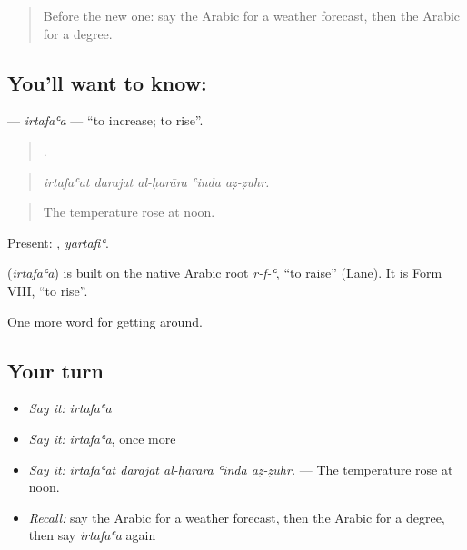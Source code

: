\label{lesson:AR-C480-irtafaa}



\begin{quote}
Before the new one: say the Arabic for a weather forecast, then the Arabic for a degree.
\end{quote}

\subsection*{You'll want to know: }
\textbf{} — \emph{irtafaʿa} — \textquotedblleft{}to increase; to rise\textquotedblright{}.

\begin{quote}
    .
\end{quote}

\begin{quote}
\emph{irtafaʿat darajat al-ḥarāra ʿinda aẓ-ẓuhr.}
\end{quote}

\begin{quote}
The temperature rose at noon.
\end{quote}

Present: , \emph{yartafiʿ}.

\begin{cousinweb}
\textbf{} (\emph{irtafaʿa}) is built on the native Arabic root \emph{r-f-ʿ}, \textquotedblleft{}to raise\textquotedblright{} (Lane). It is Form VIII, \textquotedblleft{}to rise\textquotedblright{}.
\end{cousinweb}

\begin{grammarlens}[title={What you've built}]
One more word for getting around.
\end{grammarlens}

\subsection*{Your turn}
\begin{itemize}
\raggedright
  \item \emph{Say it:} \emph{irtafaʿa}
  \item \emph{Say it:} \emph{irtafaʿa}, once more
  \item \emph{Say it:} \emph{irtafaʿat darajat al-ḥarāra ʿinda aẓ-ẓuhr.} — The temperature rose at noon.
  \item \emph{Recall:} say the Arabic for a weather forecast, then the Arabic for a degree, then say \emph{irtafaʿa} again
\end{itemize}

